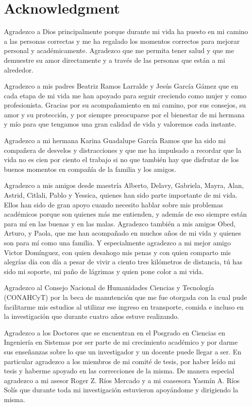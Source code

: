 
\chapter{Acknowledgment}

Agradezco a Dios principalmente porque durante mi vida ha puesto en mi camino a las personas correctas y me ha regalado los momentos correctos para mejorar personal y académicamente. Agradezco que me permita tener salud y que me demuestre su amor directamente y a través de las personas que están a mi alrededor. 

Agradezco a mis padres Beatriz Ramos Larralde y Jesús García Gámez que en cada etapa de mi vida me han apoyado para seguir creciendo como mujer y como profesionista. Gracias por su acompañamiento en mi camino, por sus consejos, su amor y su protección, y por siempre preocuparse por el bienestar de mi hermana y mío para que tengamos una gran calidad de vida y valoremos cada instante. 

Agradezco a mi hermana Karina Guadalupe García Ramos que ha sido mi compañera de desvelos y distracciones y que me ha impulsado a recordar que la vida no es cien por ciento el trabajo si no que también hay que disfrutar de los buenos momentos en compañía de la familia y los amigos.

Agradezco a mis amigos desde maestría Alberto, Delavy, Gabriela, Mayra, Alan, Astrid, Citlali, Pablo y Yessica, quienes han sido parte importante de mi vida. Ellos han sido de gran apoyo cuando necesito hablar sobre mis problemas académicos porque son quienes más me entienden, y además de eso siempre están para mí en las buenas y en las malas. Agradezco también a mis amigos Obed, Arturo, y Paola, que me han acompañado en muchos años de mi vida y quienes son para mí como una familia. Y especialmente agradezco a mi mejor amigo Victor Domínguez, con quien desahogo mis penas y con quien comparto mis alegrías día con día a pesar de vivir a ciento tres kilómetros de distancia, tú has sido mi soporte, mi paño de lágrimas y quien pone color a mi vida.

Agradezco al Consejo Nacional de Humanidades Ciencias y Tecnología (CONAH\-CyT) por la beca de manutención que me fue otorgada con la cual pude facilitarme mis estudios al utilizar ese ingreso en transporte, comida e incluso en la investigación que durante cuatro años estuve realizando. 

Agradezco a los Doctores que se encuentran en el Posgrado en Ciencias en Ingeniería en Sistemas por ser parte de mi crecimiento académico y por darme sus enseñanzas sobre lo que un investigador y un docente puede llegar a ser. En particular agradezco a los miembros de mi comité de tesis, por haber leído mi tesis y haberme apoyado en las correcciones de la misma. De manera especial agradezco a mi asesor Roger Z. Ríos Mercado y a mi coasesora Yasmín A. Ríos Solís que durante toda mi investigación estuvieron apoyándome y dirigiendo la misma. 

